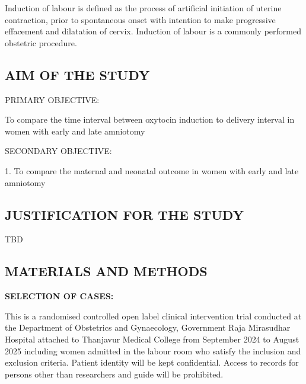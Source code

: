 \documentclass[14pt]{extarticle}
\begin{document}
\newpage
\justifying
Induction of labour is defined as the process of artificial initiation of uterine contraction, prior to spontaneous onset with intention to make progressive effacement and dilatation of cervix. Induction of labour is a commonly performed obstetric procedure. 
\newpage
\null
\vfill
\begin{flushright}
    \section{AIM OF THE STUDY}
\end{flushright}
\hrulefill
\newpage

PRIMARY OBJECTIVE:

To compare the time interval between oxytocin induction to delivery interval in women with early and late amniotomy

SECONDARY OBJECTIVE:

1. To compare the maternal and neonatal outcome in women with early and late amniotomy 

\newpage
\null
\vfill
\begin{flushright}
    \section{JUSTIFICATION FOR THE STUDY}
\end{flushright}
\hrulefill
\newpage

TBD

\newpage

\null
\vfill
\begin{flushright}
    \section{MATERIALS AND METHODS}
\end{flushright}
\hrulefill
\newpage

\textbf{\large SELECTION OF CASES:} 
\vspace{5mm}
\par This is a randomised controlled open label clinical intervention trial conducted at the Department of Obstetrics and Gynaecology, Government Raja Mirasudhar Hospital attached to Thanjavur Medical College from September 2024 to August 2025 including women admitted in the labour room who satisfy the inclusion and exclusion criteria. Patient identity will be kept confidential. Access to records for persons other than researchers and guide will be prohibited.

\vspace{5mm}
\end{document}
